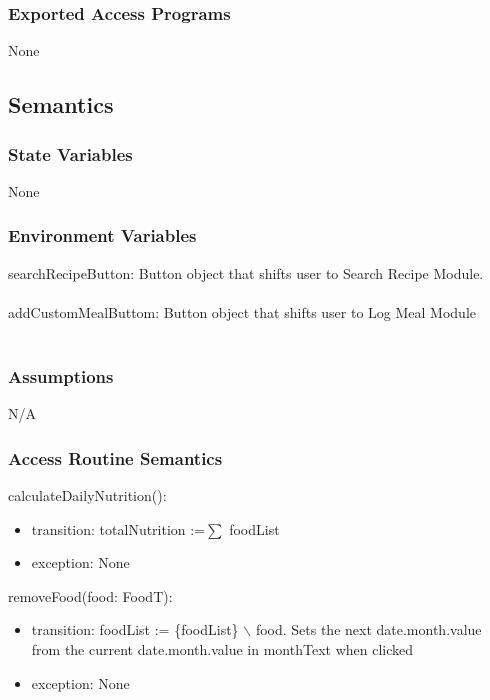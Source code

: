 \documentclass[12pt, titlepage]{article}
\begin{document}
\subsubsection{Exported Access Programs}

None

\subsection{Semantics}

\subsubsection{State Variables}
None

\subsubsection{Environment Variables}

searchRecipeButton: Button object that shifts user to Search Recipe Module.\\\\
addCustomMealButtom: Button object that shifts user to Log Meal Module\\\\

\subsubsection{Assumptions}

N/A

\subsubsection{Access Routine Semantics}

\noindent calculateDailyNutrition():
\begin{itemize}
	\item transition: totalNutrition :=$ \sum $ foodList
	\item exception: None 
\end{itemize}

\noindent removeFood(food: FoodT):
\begin{itemize}
	\item transition: foodList := \{foodList\} $\backslash$ food. Sets the next date.month.value from the current date.month.value in monthText when clicked
	\item exception: None 
\end{itemize}
\end{document}
